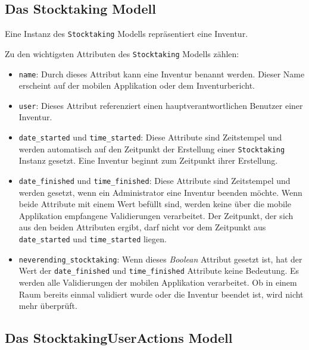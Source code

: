 \hypertarget{das-stocktaking-modell}{%
\subsection{Das Stocktaking Modell}\label{das-stocktaking-modell}}

Eine Instanz des \texttt{Stocktaking} Modells repräsentiert eine
Inventur.

Zu den wichtigsten Attributen des \texttt{Stocktaking} Modells zählen:

\begin{itemize}
\tightlist
\item
  \texttt{name}: Durch dieses Attribut kann eine Inventur benannt
  werden. Dieser Name erscheint auf der mobilen Applikation oder dem
  Inventurbericht.
\item
  \texttt{user}: Dieses Attribut referenziert einen
  hauptverantwortlichen Benutzer einer Inventur.
\item
  \texttt{date\_started} und \texttt{time\_started}: Diese Attribute
  sind Zeitstempel und werden automatisch auf den Zeitpunkt der
  Erstellung einer \texttt{Stocktaking} Instanz gesetzt. Eine Inventur
  beginnt zum Zeitpunkt ihrer Erstellung.
\item
  \texttt{date\_finished} und \texttt{time\_finished}: Diese Attribute
  sind Zeitstempel und werden gesetzt, wenn ein Administrator eine
  Inventur beenden möchte. Wenn beide Attribute mit einem Wert befüllt
  sind, werden keine über die mobile Applikation empfangene
  Validierungen verarbeitet. Der Zeitpunkt, der sich aus den beiden
  Attributen ergibt, darf nicht vor dem Zeitpunkt aus
  \texttt{date\_started} und \texttt{time\_started} liegen.
\item
  \texttt{neverending\_stocktaking}: Wenn dieses
  \emph{Boolean}
  Attribut gesetzt ist, hat der Wert der \texttt{date\_finished} und
  \texttt{time\_finished} Attribute keine Bedeutung. Es werden alle
  Validierungen der mobilen Applikation verarbeitet. Ob in einem Raum
  bereits einmal validiert wurde oder die Inventur beendet ist, wird
  nicht mehr überprüft.
\end{itemize}

\hypertarget{das-stocktakinguseractions-modell}{%
\subsection{Das StocktakingUserActions
Modell}\label{das-stocktakinguseractions-modell}}

